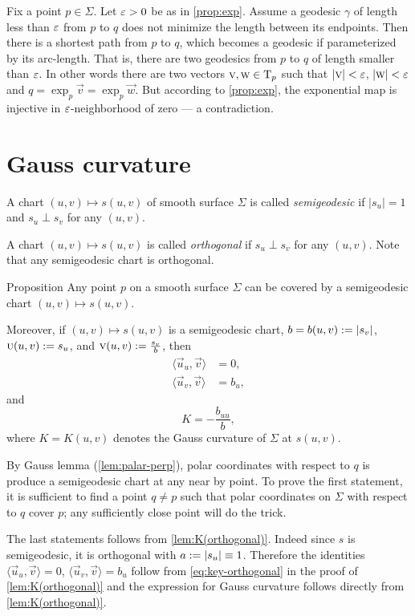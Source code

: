 Fix a point $p\in\Sigma$.
Let $\varepsilon>0$ be as in \ref{prop:exp}.
Assume a geodesic $\gamma$ of length less than $\varepsilon$ from $p$ to $q$ does not minimize the length between its endpoints.
Then there is a shortest path from $p$ to $q$, which becomes a geodesic if parameterized by its arc-length.
That is, there are two geodesics from $p$ to $q$ of length smaller than $\varepsilon$.
In other words there are two vectors ${\textsc v},\textsc w\in\mathrm{T}_p$ such that $|{\textsc v}|<\varepsilon$, $|\textsc w|<\varepsilon$ and 
$q=\exp_p\vec v=\exp_p\vec w$.
But according to \ref{prop:exp}, the exponential map is injective in $\varepsilon$-neighborhood of zero --- a contradiction.\qeds

\section{Gauss curvature}

A chart $(u,v)\mapsto s(u,v)$ of smooth surface $\Sigma$ is called \emph{semigeodesic} if $|s_u|=1$ and $s_u\perp s_v$ for any $(u,v)$.

A chart $(u,v)\mapsto s(u,v)$ is called \emph{orthogonal} if $s_u\perp s_v$ for any $(u,v)$.
Note that any semigeodesic chart is orthogonal.

\begin{thm}{Proposition}\label{prop:K(semigeodesic)}
Any point $p$ on a smooth surface $\Sigma$ can be covered by a semigeodesic chart $(u,v)\mapsto s(u,v)$.

Moreover, if $(u,v)\mapsto s(u,v)$ is a semigeodesic chart, 
$b=b(u,v)\z\df|s_v|$,
$\textsc u(u,v):= s_u$,
and 
$\textsc v(u,v):=\tfrac{s_v}b$,
then 
\begin{align*}
\langle\vec u_u,\vec v\rangle&=0,
\\
\langle\vec u_v,\vec v\rangle&=b_u,
\end{align*}
and 
\[K=-\frac{b_{uu}}b,\]
where $K=K(u,v)$ denotes the Gauss curvature of $\Sigma$ at $s(u,v)$.

\end{thm}

By Gauss lemma (\ref{lem:palar-perp}), polar coordinates with respect to $q$ is produce a semigeodesic chart at any near by point.
To prove the first statement, it is sufficient to find a point $q\ne p$ such that polar coordinates on $\Sigma$ with respect to $q$ cover $p$;
any sufficiently close point will do the trick.

The last statements follows from \ref{lem:K(orthogonal)}.
Indeed since $s$ is semigeodesic, it is orthogonal with $a:=|s_u|\equiv1$.
Therefore the identities $\langle\vec u_u,\vec v\rangle=0$,
$\langle\vec u_v,\vec v\rangle=b_u$ follow from \ref{eq:key-orthogonal} in the proof of \ref{lem:K(orthogonal)}
and the expression for Gauss curvature follows directly from \ref{lem:K(orthogonal)}.
\qeds

